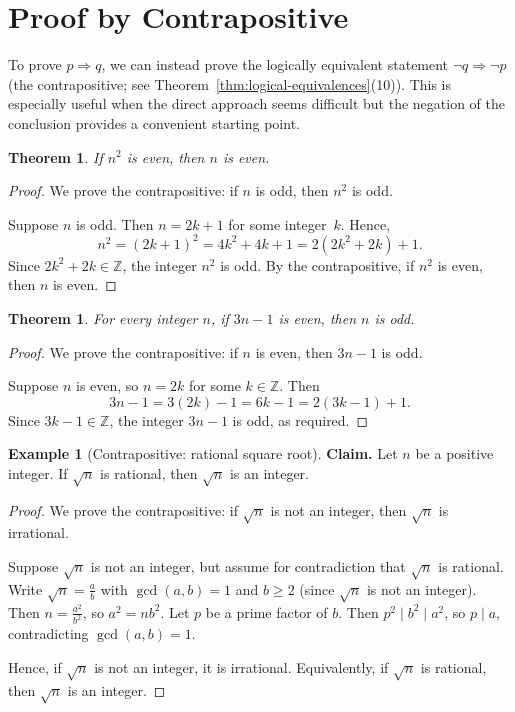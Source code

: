 \documentclass[12pt,a4paper,openany]{book}
\theoremstyle{definition}
\newtheorem{example}[definition]{Example}
\theoremstyle{plain}
\newtheorem{theorem}[definition]{Theorem}
\theoremstyle{remark}
\newcommand{\Z}{\mathbb{Z}}
\begin{document}
\section{Proof by Contrapositive}
\label{sec:contrapositive-proof}

To prove $p \Rightarrow q$, we can instead prove the logically equivalent statement
$\lnot q \Rightarrow \lnot p$ (the contrapositive; see
Theorem~\ref{thm:logical-equivalences}(10)). This is especially useful when the
direct approach seems difficult but the negation of the conclusion provides a
convenient starting point.

\begin{theorem}
\label{thm:n2-even-then-n-even}
If $n^2$ is even, then $n$ is even.
\end{theorem}

\begin{proof}
We prove the contrapositive: if $n$ is odd, then $n^2$ is odd.

Suppose $n$ is odd. Then $n = 2k + 1$ for some integer~$k$. Hence,
\[
  n^2 = (2k+1)^2 = 4k^2 + 4k + 1 = 2(2k^2 + 2k) + 1.
\]
Since $2k^2 + 2k \in \Z$, the integer $n^2$ is odd. By the contrapositive, if $n^2$
is even, then $n$ is even.
\end{proof}

\begin{theorem}
\label{thm:contrapositive-3nminus1}
For every integer $n$, if $3n - 1$ is even, then $n$ is odd.
\end{theorem}

\begin{proof}
We prove the contrapositive: if $n$ is even, then $3n - 1$ is odd.

Suppose $n$ is even, so $n = 2k$ for some $k \in \Z$. Then
\[
  3n - 1 = 3(2k) - 1 = 6k - 1 = 2(3k - 1) + 1.
\]
Since $3k - 1 \in \Z$, the integer $3n - 1$ is odd, as required.
\end{proof}

\begin{example}[Contrapositive: rational square root]
\label{ex:contrapositive-sqrt}
\textbf{Claim.} Let $n$ be a positive integer. If $\sqrt{n}$ is rational, then
$\sqrt{n}$ is an integer.

\begin{proof}
We prove the contrapositive: if $\sqrt{n}$ is not an integer, then $\sqrt{n}$ is
irrational.

Suppose $\sqrt{n}$ is not an integer, but assume for contradiction that $\sqrt{n}$
is rational. Write $\sqrt{n} = \frac{a}{b}$ with $\gcd(a,b) = 1$ and $b \geq 2$
(since $\sqrt{n}$ is not an integer). Then $n = \frac{a^2}{b^2}$, so $a^2 = nb^2$.
Let $p$ be a prime factor of $b$. Then $p^2 \mid b^2 \mid a^2$, so $p \mid a$,
contradicting $\gcd(a,b) = 1$.

Hence, if $\sqrt{n}$ is not an integer, it is irrational. Equivalently, if $\sqrt{n}$
is rational, then $\sqrt{n}$ is an integer.
\end{proof}
\end{example}
\end{document}
